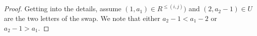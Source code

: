 \documentclass{amsart}
\let\origtodo\todo
\renewcommand{\todo}[1]{\origtodo[inline]{#1}}
\theoremstyle{definition}
\theoremstyle{remark}
\numberwithin{equation}{subsection}
\newcommand{\RC}{\mathcal{RC}}
\newcommand{\lmap}{\mathscr{L}}
\begin{document}
\begin{proof}
Getting into the details, assume $(1,a_1)\in R^{\leq(i, j)})$ and $(2,a_2-1)\in U$ are the two letters of the swap. We note that either $a_2 - 1 < a_1 - 2$ or $a_2 - 1 > a_1$.


\end{proof}



\end{document}
